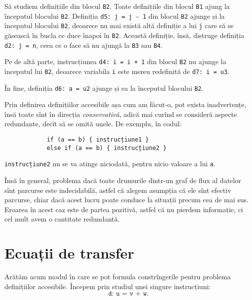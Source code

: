 Să studiem definițiile din blocul \texttt{B2}. Toate definițiile din blocul
\texttt{B1} ajung la începutul blocului \texttt{B2}. Definiția
\texttt{d5:\!\!\!\! j = j - 1} din blocul \texttt{B2} ajunge și la începutul blocului
\texttt{B2}, deoarece nu mai există altă definiție a lui \texttt{j} care să
se găsească în bucla ce duce înapoi în \texttt{B2}. Această definiție, însă,
distruge definiția \texttt{d2:\!\!\!\! j = n}, ceea ce o face să nu ajungă la
\texttt{B3} sau \texttt{B4}.

Pe de altă parte, instrucțiunea \texttt{d4:\!\!\!\! i = i + 1} din blocul \texttt{B2}
nu ajunge la începutul lui \texttt{B2}, deoarece variabila \texttt{i} este
mereu redefinită de \texttt{d7:\!\!\!\! i = u3}.

În fine, definiția \texttt{d6:\!\!\!\! a = u2} ajunge și ea la începutul blocului
\texttt{B2}.

\begin{remark}\label{rk:safe}
    Prin definirea definițiilor accesibile așa cum am făcut-o, pot exista
    in\-ad\-ver\-ten\-țe, însă toate sînt în direcția \emph{conservativă}, adică mai curînd
    se consideră aspecte redundante, decît să se omită unele. De exemplu, în codul:
    \begin{center}
        \begin{BVerbatim}
            if (a == b) { instrucțiune1 } 
            else if (a == b) { instrucțiune2 }
        \end{BVerbatim}
    \end{center}
    \texttt{instrucțiune2} nu se va atinge niciodată, pentru nicio valoare a lui \texttt{a}.

    Însă în general, problema dacă toate drumurile dintr-un graf de flux al datelor
    sînt parcurse este indecidabilă, astfel că alegem asumpția că ele sînt efectiv
    parcurse, chiar dacă acest lucru poate conduce la situații precum cea de mai
    sus. Eroarea în acest caz este de partea pozitivă, astfel că nu pierdem informație,
    ci cel mult avem o cantitate redundantă.
\end{remark}

\section{Ecuații de transfer}

Arătăm acum modul în care se pot formula constrîngerile pentru problema
definițiilor accesibile. Începem prin studiul unei singure instrucțiuni:
\[
    \texttt{d: u = v + w}.
\]

